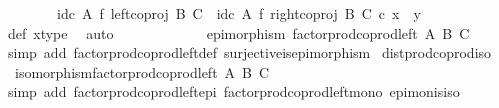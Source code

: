 \begin{isabellebody}
\ \ \ \ \ \ \ \ {\isacharparenleft}{\kern0pt}id\isactrlsub c\ A\ {\isasymtimes}\isactrlsub f\ left{\isacharunderscore}{\kern0pt}coproj\ B\ C{\isacharparenright}{\kern0pt}\ {\isasymamalg}\ {\isacharparenleft}{\kern0pt}id\isactrlsub c\ A\ {\isasymtimes}\isactrlsub f\ right{\isacharunderscore}{\kern0pt}coproj\ B\ C{\isacharparenright}{\kern0pt}\ {\isasymcirc}\isactrlsub c\ x\ {\isacharequal}{\kern0pt}\ y{\isachardoublequoteclose}\isanewline
\ \ \ \ \ \ \ \ \isamarkupfalse%
\ {\isasymphi}{\isacharunderscore}{\kern0pt}def\ x{\isacharunderscore}{\kern0pt}type\ \isamarkupfalse%
\ auto\isanewline
\ \ \ \ \isamarkupfalse%
\isanewline
\ \ \isamarkupfalse%
\isanewline
\ \ \isamarkupfalse%
\ \isamarkupfalse%
\ {\isachardoublequoteopen}epimorphism\ {\isacharparenleft}{\kern0pt}factor{\isacharunderscore}{\kern0pt}prod{\isacharunderscore}{\kern0pt}coprod{\isacharunderscore}{\kern0pt}left\ A\ B\ C{\isacharparenright}{\kern0pt}{\isachardoublequoteclose}\isanewline
\ \ \ \ \isamarkupfalse%
\ {\isacharparenleft}{\kern0pt}simp\ add{\isacharcolon}{\kern0pt}\ factor{\isacharunderscore}{\kern0pt}prod{\isacharunderscore}{\kern0pt}coprod{\isacharunderscore}{\kern0pt}left{\isacharunderscore}{\kern0pt}def\ surjective{\isacharunderscore}{\kern0pt}is{\isacharunderscore}{\kern0pt}epimorphism{\isacharparenright}{\kern0pt}\isanewline
{}\isamarkupfalse%
%
\endisatagproof
{\isafoldproof}%
%
\isadelimproof
\isanewline
%
\endisadelimproof
\isanewline
{}\isamarkupfalse%
\ dist{\isacharunderscore}{\kern0pt}prod{\isacharunderscore}{\kern0pt}coprod{\isacharunderscore}{\kern0pt}iso{\isacharcolon}{\kern0pt}\isanewline
\ \ {\isachardoublequoteopen}isomorphism{\isacharparenleft}{\kern0pt}factor{\isacharunderscore}{\kern0pt}prod{\isacharunderscore}{\kern0pt}coprod{\isacharunderscore}{\kern0pt}left\ A\ B\ C{\isacharparenright}{\kern0pt}{\isachardoublequoteclose}\isanewline
%
\isadelimproof
\ \ %
\endisadelimproof
%
\isatagproof
{}\isamarkupfalse%
\ {\isacharparenleft}{\kern0pt}simp\ add{\isacharcolon}{\kern0pt}\ factor{\isacharunderscore}{\kern0pt}prod{\isacharunderscore}{\kern0pt}coprod{\isacharunderscore}{\kern0pt}left{\isacharunderscore}{\kern0pt}epi\ factor{\isacharunderscore}{\kern0pt}prod{\isacharunderscore}{\kern0pt}coprod{\isacharunderscore}{\kern0pt}left{\isacharunderscore}{\kern0pt}mono\ epi{\isacharunderscore}{\kern0pt}mon{\isacharunderscore}{\kern0pt}is{\isacharunderscore}{\kern0pt}iso{\isacharparenright}{\kern0pt}%
\endisatagproof
{\isafoldproof}%

\end{isabellebody}
